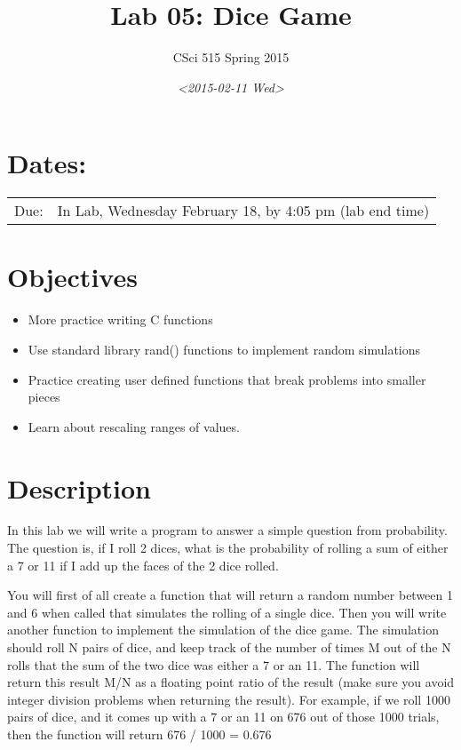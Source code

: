 \documentclass[11pt]{article}
\author{CSci 515 Spring 2015}
\date{\textit{<2015-02-11 Wed>}}
\title{Lab 05: Dice Game}
\begin{document}
\maketitle

\section*{Dates:}
\label{sec-1}
\begin{center}
\begin{tabular}{ll}
Due: & In Lab, Wednesday February 18, by 4:05 pm (lab end time)\\
\end{tabular}
\end{center}
\section*{Objectives}
\label{sec-2}
\begin{itemize}
\item More practice writing C functions
\item Use standard library rand() functions to implement random simulations
\item Practice creating user defined functions that break problems into smaller pieces
\item Learn about rescaling ranges of values.
\end{itemize}
\section*{Description}
\label{sec-3}
In this lab we will write a program to answer a simple question from
probability.  The question is, if I roll 2 dices, what is the probability
of rolling a sum of either a 7 or 11 if I add up the faces of the 2 dice
rolled.

You will first of all create a function that will return a random
number between 1 and 6 when called that simulates the rolling of a
single dice.  Then you will write another function to implement the
simulation of the dice game.  The simulation should roll N pairs of
dice, and keep track of the number of times M out of the N rolls that
the sum of the two dice was either a 7 or an 11.  The function will
return this result M/N as a floating point ratio of the result (make
sure you avoid integer division problems when returning the result).
For example, if we roll 1000 pairs of dice, and it comes up with a 7
or an 11 on 676 out of those 1000 trials, then the function will
return 676 / 1000 = 0.676
\end{document}
